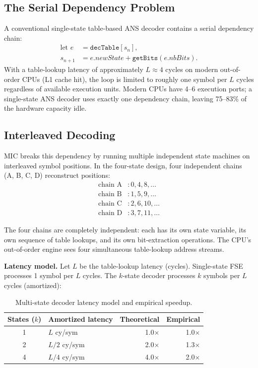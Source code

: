 \documentclass[journal]{IEEEtran}
\begin{document}
\subsection{The Serial Dependency Problem}

A conventional single-state table-based ANS decoder contains a serial
dependency chain:
\begin{equation}
\begin{aligned}
  \text{let } e &= \texttt{decTable}[s_n], \\
  s_{n+1} &= e.\textit{newState} + \texttt{getBits}(e.\textit{nbBits}).
\end{aligned}
\end{equation}
With a table-lookup latency of approximately $L \approx 4$ cycles on modern
out-of-order CPUs (L1 cache hit), the loop is limited to roughly one symbol per
$L$ cycles regardless of available execution units. Modern CPUs have 4--6
execution ports; a single-state ANS decoder uses exactly one dependency chain,
leaving 75--83\% of the hardware capacity idle.

\subsection{Interleaved Decoding}

MIC breaks this dependency by running multiple independent state machines on
interleaved symbol positions. In the four-state design, four independent chains
(A, B, C, D) reconstruct positions:
\begin{align*}
  \text{chain A}&: 0, 4, 8, \ldots \\
  \text{chain B}&: 1, 5, 9, \ldots \\
  \text{chain C}&: 2, 6, 10, \ldots \\
  \text{chain D}&: 3, 7, 11, \ldots
\end{align*}

The four chains are completely independent: each has its own state variable, its
own sequence of table lookups, and its own bit-extraction operations. The CPU's
out-of-order engine sees four simultaneous table-lookup address streams.

\textbf{Latency model.} Let $L$ be the table-lookup latency (cycles).
Single-state FSE processes 1 symbol per $L$ cycles. The $k$-state decoder
processes $k$ symbols per $L$ cycles (amortized):

\begin{table}[htbp]
\centering
\caption{Multi-state decoder latency model and empirical speedup.}
\label{tab:latency}
\begin{tabular}{clrr}
\toprule
States ($k$) & Amortized latency & Theoretical & Empirical \\
\midrule
1 & $L$ cy/sym & 1.0$\times$ & 1.0$\times$ \\
2 & $L/2$ cy/sym & 2.0$\times$ & 1.3$\times$ \\
4 & $L/4$ cy/sym & 4.0$\times$ & 2.0$\times$ \\
\bottomrule
\end{tabular}
\end{table}
\end{document}
